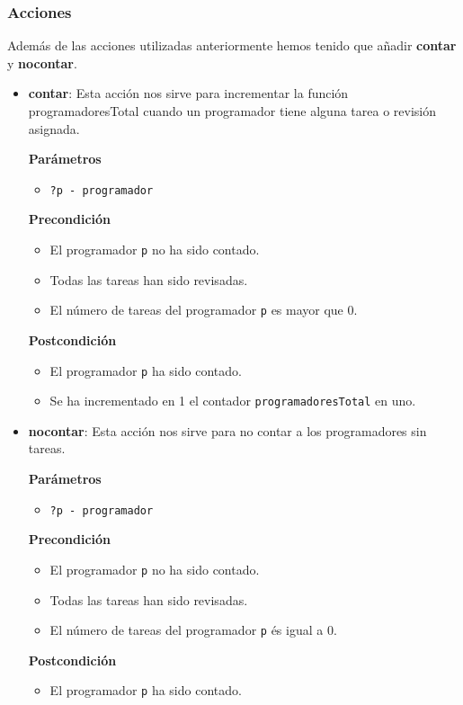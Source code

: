 \documentclass[11pt]{article}
\begin{document}
\subsubsection{Acciones}
Además de las acciones utilizadas anteriormente hemos tenido que añadir \textbf{contar} y \textbf{nocontar}.
\begin{itemize}
	\item \textbf{contar}: Esta acción nos sirve para incrementar la función programadoresTotal cuando un programador tiene alguna tarea o revisión asignada. 

	\textbf{Parámetros}
	\begin{itemize}
		\item \texttt{?p - programador}
	\end{itemize}
	\textbf{Precondición}
	\begin{itemize}
		\item El programador \texttt{p} no ha sido contado.
		\item Todas las tareas han sido revisadas.
		\item El número de tareas del programador \texttt{p} es mayor que 0. 
	\end{itemize}
	\textbf{Postcondición}
	\begin{itemize}	
		\item El programador \texttt{p} ha sido contado.
		\item Se ha incrementado en 1 el contador \texttt{programadoresTotal} en uno.
	\end{itemize}

	\item \textbf{nocontar}: Esta acción nos sirve para no contar a los programadores sin tareas. 
	
	\textbf{Parámetros}
	\begin{itemize}
		\item \texttt{?p - programador}
	\end{itemize}
	\textbf{Precondición}
	\begin{itemize}
		\item El programador \texttt{p} no ha sido contado.
		\item Todas las tareas han sido revisadas.
		\item El número de tareas del programador \texttt{p} és igual a 0. 
	\end{itemize}
	\textbf{Postcondición}
	\begin{itemize}	
		\item El programador \texttt{p} ha sido contado.
	\end{itemize}
	
\end{itemize}
\end{document}
